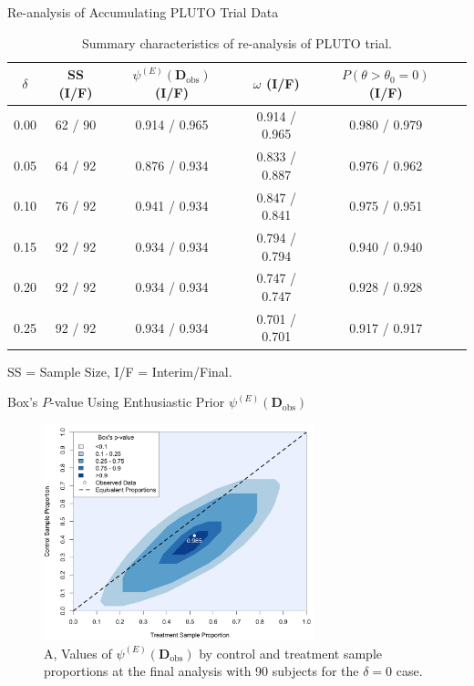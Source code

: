 \documentclass{beamer}
\begin{document}
\begin{frame}{Re-analysis of Accumulating PLUTO Trial Data}
\footnotesize
\begin{table}[htbp]\label{tbl:real-pluto}%
\centering
\caption{Summary characteristics of re-analysis of PLUTO trial.}%
\begin{tabular*}{300pt}{@{\extracolsep\fill}cccccc@{\extracolsep\fill}}%
\toprule
$\delta$	&	SS (I/F)			&	$\psi^{(E)}(\mathbf{D}_{\text{obs}})$ (I/F)			&	$\omega$ (I/F)			&	$P(\theta>\theta_0=0)$ (I/F)			\\
\midrule
0.00	&	62	/	90	&	0.914	/	0.965	&	0.914	/	0.965	&	0.980	/	0.979	\\
0.05	&	64	/	92	&	0.876	/	0.934	&	0.833	/	0.887	&	0.976	/	0.962	\\
0.10	&	76	/	92	&	0.941	/	0.934	&	0.847	/	0.841	&	0.975	/	0.951	\\
0.15	&	92	/	92	&	0.934	/	0.934	&	0.794	/	0.794	&	0.940	/	0.940	\\
0.20	&	92	/	92	&	0.934	/	0.934	&	0.747	/	0.747	&	0.928	/	0.928	\\
0.25	&	92	/	92	&	0.934	/	0.934	&	0.701	/	0.701	&	0.917	/	0.917	\\
\bottomrule
\end{tabular*}
\end{table}
\hspace{0.75cm} SS = Sample Size, I/F = Interim/Final.
\end{frame}

\begin{frame}{Box's $P$-value Using Enthusiastic Prior $\psi^{(E)}(\mathbf{D}_{\text{obs}})$ }

\vspace{-0.3cm}
\begin{figure}[htbp]
\begin{center}
\includegraphics[width=0.7\textwidth]{./figures/2dbayesp.png}
    \caption{A, Values of $\psi^{(E)}(\mathbf{D}_{\text{obs}})$ by control and treatment sample proportions at the final analysis with 90 subjects for the $\delta=0$ case.}
\label{fig:2dheatmaps}
 \end{center}
\end{figure}
\end{frame}
\end{document}
